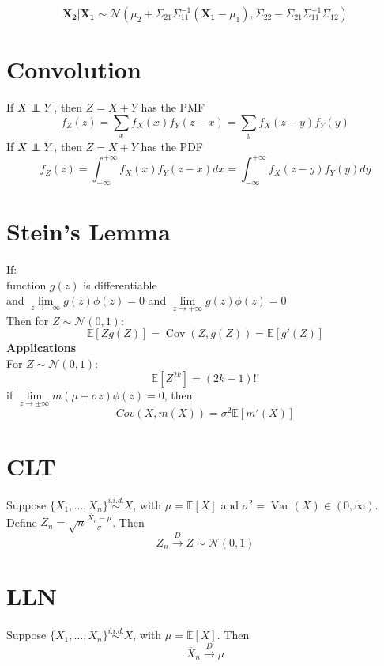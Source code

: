\documentclass[twocolumn]{amsart}
\newcommand{\E}{\mathbb{E}}
\newcommand{\Cov}{\operatorname{Cov}}
\newcommand{\Var}{\operatorname{Var}}
\newcommand\independent{\protect\mathpalette{\protect\independenT}{\perp}}
\def\independenT#1#2{\mathrel{\rlap{$#1#2$}\mkern3mu{#1#2}}}
\begin{document}
\begin{equation*}
  \boldsymbol{X_{2}} | \boldsymbol{X_{1}} \sim \mathcal{N}(\mu_{2}+\Sigma_{21}\Sigma_{11}^{-1}(\boldsymbol{X_{1}} - \mu_{1}),\Sigma_{22} - \Sigma_{21}\Sigma_{11}^{-1}\Sigma_{12})
\end{equation*}

\section*{Convolution}
If \(X \independent Y\), then \(Z = X + Y\) has the PMF
\begin{equation*}
  f_{Z}(z) = \sum_{x}{f_{X}(x)f_{Y}(z-x)} = \sum_{y}{f_{X}(z-y)f_{Y}(y)}
\end{equation*}
If \(X \independent Y\), then \(Z = X + Y\) has the PDF
\begin{equation*}
  f_{Z}(z) = \int_{-\infty}^{+\infty} f_{X}(x) f_{Y}(z-x) dx = \int_{-\infty}^{+\infty} f_{X}(z-y) f_{Y}(y) dy
\end{equation*}

\section*{Stein's Lemma}
If:\\
function \(g(z)\) is differentiable\\
and \(\lim\limits_{z\to-\infty} g(z)\phi(z) = 0\) and \(\lim\limits_{z\to+\infty} g(z)\phi(z) = 0\) \\
Then for \(Z\sim\mathcal{N}(0, 1)\):
\begin{equation*}
  \E[Z g(Z)] = \Cov(Z, g(Z)) = \E[g'(Z)]
\end{equation*}
\textbf{Applications}\\
For \(Z\sim\mathcal{N}(0,1)\):
\begin{equation*}
  \E[Z^{2k}] = (2k - 1)!!
\end{equation*}
if \(\lim\limits_{z\to\pm\infty} m(\mu + \sigma z)\phi(z)=0\), then:
\begin{equation*}
  Cov(X,m(X)) = \sigma^{2}\E[m'(X)]
\end{equation*}

\section*{CLT}
Suppose \(\{X_{1},\ldots,X_{n}\} \overset{i.i.d.}{\sim} X\), with \(\mu = \E[X]\) and \(\sigma^{2} = \Var(X) \in (0, \infty)\). Define \(Z_{n}=\sqrt{n}\frac{\overline{X}_{n}-\mu}{\sigma}\). Then
\begin{equation*}
  Z_{n} \overset{D}{\longrightarrow} Z\sim\mathcal{N}(0,1)
\end{equation*}

\section*{LLN}
Suppose \(\{X_{1},\ldots,X_{n}\} \overset{i.i.d.}{\sim} X\), with \(\mu = \E[X]\). Then
\begin{equation*}
  \overline{X}_{n} \overset{D}{\longrightarrow} \mu
\end{equation*}
\end{document}
